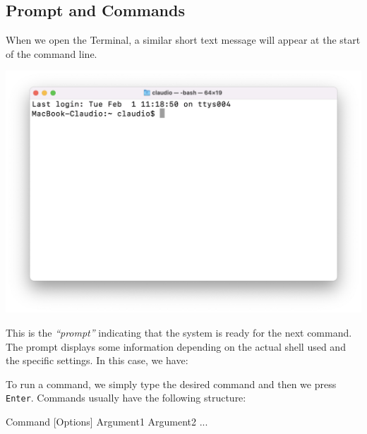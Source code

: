 \documentclass[
  11pt,
]{book}
\newenvironment{Shaded}{\begin{snugshade}}{\end{snugshade}}
\newcommand{\ExtensionTok}[1]{#1}
\newcommand{\NormalTok}[1]{#1}
\begin{document}
\hypertarget{prompt-and-commands}{%
\subsection{Prompt and Commands}\label{prompt-and-commands}}

When we open the Terminal, a similar short text message will appear at the start of the command line.

\begin{center}\includegraphics[width=0.8\linewidth]{images/terminal/terminal} \end{center}

This is the \emph{``prompt''} indicating that the system is ready for the next command. The prompt displays some information depending on the actual shell used and the specific settings. In this case, we have:

\begin{Shaded}
\end{Shaded}

To run a command, we simply type the desired command and then we press \texttt{Enter}. Commands usually have the following structure:

\begin{Shaded}
\begin{Highlighting}[]
\ExtensionTok{Command}\NormalTok{ [Options] Argument1 Argument2 ...}
\end{Highlighting}
\end{Shaded}
\end{document}
